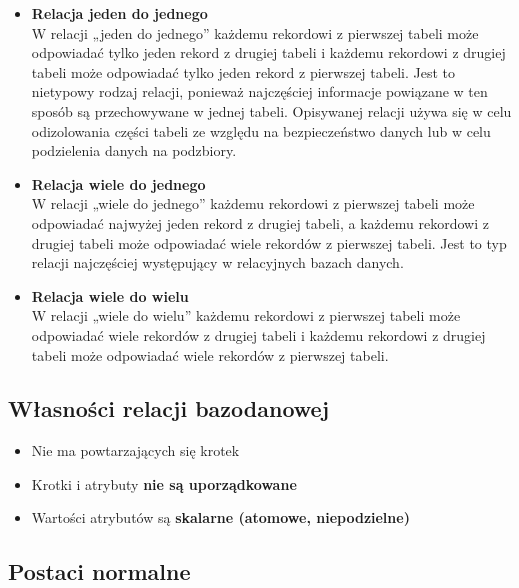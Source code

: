 \documentclass[12pt]{article}
\begin{document}
    \begin{itemize}
        \item \textbf{Relacja jeden do jednego}\\
        W relacji „jeden do jednego” każdemu rekordowi z pierwszej tabeli może odpowiadać tylko jeden rekord z drugiej tabeli i każdemu rekordowi z drugiej tabeli może odpowiadać tylko jeden rekord z pierwszej tabeli. Jest to nietypowy rodzaj relacji, ponieważ najczęściej informacje powiązane w ten sposób są przechowywane w jednej tabeli. Opisywanej relacji używa się w celu odizolowania części tabeli ze względu na bezpieczeństwo danych lub w celu podzielenia danych na podzbiory.
        \item \textbf{Relacja wiele do jednego}\\
        W relacji „wiele do jednego” każdemu rekordowi z pierwszej tabeli może odpowiadać najwyżej jeden rekord z drugiej tabeli, a każdemu rekordowi z drugiej tabeli może odpowiadać wiele rekordów z pierwszej tabeli. Jest to typ relacji najczęściej występujący w relacyjnych bazach danych.
        \item \textbf{Relacja wiele do wielu}\\
        W relacji „wiele do wielu” każdemu rekordowi z pierwszej tabeli może odpowiadać wiele rekordów z drugiej tabeli i każdemu rekordowi z drugiej tabeli może odpowiadać wiele rekordów z pierwszej tabeli.
    \end{itemize}
    
    \subsection{Własności relacji bazodanowej}
    
    \begin{itemize}
        \item Nie ma powtarzających się krotek
        \item Krotki i atrybuty \textbf{nie są uporządkowane}
        \item Wartości atrybutów są \textbf{skalarne (atomowe, niepodzielne)}
    \end{itemize}
    
    \subsection{Postaci normalne}
    
\end{document}
